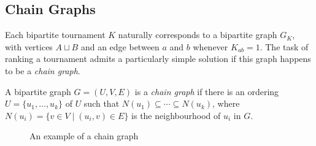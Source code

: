 \subsection{Chain Graphs}

Each bipartite tournament $K$ naturally corresponds to a bipartite graph $G_K$,
with vertices $A \sqcup B$ and an edge between $a$ and $b$ whenever $K_{ab} =
1$.\footnotemark{} The task of ranking a tournament admits a particularly
simple solution if this graph happens to be a \emph{chain graph}.


\begin{definition}
\label{tourn_def_chain_graph}

    A bipartite graph $G = (U, V, E)$ is a \emph{chain graph} if there is an
    ordering $U = \{u_1,\ldots,u_k\}$ of $U$ such that $N(u_1) \subseteq \cdots
    \subseteq N(u_k)$, where $N(u_i) = \{v \in V \mid (u_i, v) \in E\}$ is the
    neighbourhood of $u_i$ in $G$.

\end{definition}

\begin{figure}
    \centering
    \caption{An example of a chain graph}
    \label{tourn_fig_chain_graph_example}
\end{figure}


